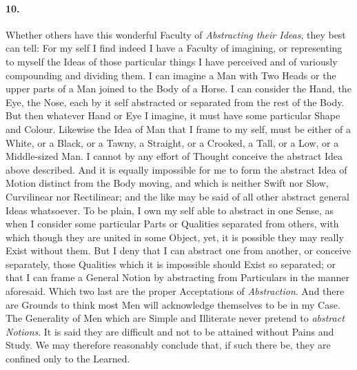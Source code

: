 \documentclass[]{article}
\newenvironment{sectionbody}{}{}
\begin{document}
\begin{sectionbody}
\paragraph{10.} Whether others have this wonderful Faculty of \emph{Abstracting
their Ideas}, they best can tell: For my self I find indeed
I have a Faculty of imagining, or representing to myself the
Ideas of those particular things I have perceived and of
variously compounding and dividing them.  I can imagine a Man
with Two Heads or the upper parts of a Man joined to the Body of
a Horse.  I can consider the Hand, the Eye, the Nose, each by it
self abstracted or separated from the rest of the Body.  But then
whatever Hand or Eye I imagine, it must have some particular
Shape and Colour.  Likewise the Idea of Man that I frame to my
self, must be either of a White, or a Black, or a Tawny, a
Straight, or a Crooked, a Tall, or a Low, or a Middle-sized Man.
I cannot by any effort of Thought conceive the abstract Idea
above described.  And it is equally impossible for me to form the
abstract Idea of Motion distinct from the Body moving, and which
is neither Swift nor Slow, Curvilinear nor Rectilinear; and the
like may be said of all other abstract general Ideas whatsoever.
To be plain, I own my self able to abstract in one Sense, as when
I consider some particular Parts or Qualities separated from
others, with which though they are united in some Object, yet, it
is possible they may really Exist without them.  But I deny that
I can abstract one from another, or conceive separately, those
Qualities which it is impossible should Exist so separated; or
that I can frame a General Notion by abstracting from
Particulars in the manner aforesaid.  Which two last are the
proper Acceptations of \emph{Abstraction}.  And there are
Grounds to think most Men will acknowledge themselves to be in my
Case.  The Generality of Men which are Simple and Illiterate
never pretend to \emph{abstract Notions}.  It is said they are
difficult and not to be attained without Pains and Study.  We may
therefore reasonably conclude that, if such there be, they are
confined only to the Learned.




\end{sectionbody}
\end{document}
